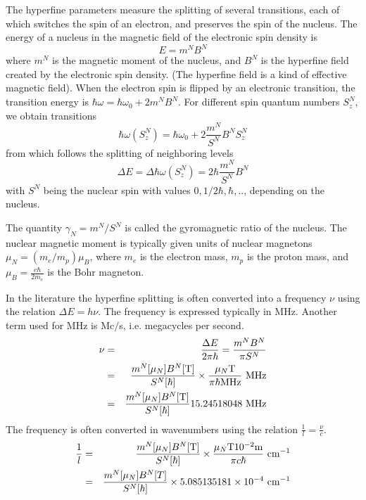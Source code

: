\documentclass[final,12pt]{article}
\begin{document}
The hyperfine parameters measure the splitting of several transitions,
each of which switches the spin of an electron, and preserves the spin
of the nucleus. The energy of a nucleus in the magnetic field of the
electronic spin density is
\begin{displaymath}
E=m^N B^N
\end{displaymath}
where $m^N$ is the magnetic moment of the nucleus, and $B^N$ is the
hyperfine field created by the electronic spin density. (The hyperfine
field is a kind of effective magnetic field). When the electron spin
is flipped by an electronic transition, the transition energy is
$\hbar\omega=\hbar\omega_0+2m^NB^N$. For different spin quantum
numbers $S^N_z$, we obtain transitions
\begin{equation}
\hbar\omega(S^N_z)=\hbar\omega_0+2\frac{m^N}{S^N}B^N S^N_z
\end{equation}
from which follows the splitting of neighboring levels
\begin{equation}
\Delta E=\Delta \hbar\omega(S^N_z)=2\hbar\frac{m^N}{S^N}B^N 
\end{equation}
with $S^N$ being the nuclear spin with values $0,1/2\hbar,\hbar,..$,
depending on the nucleus.

The quantity $\gamma_N=m^N/S^N$ is called the gyromagnetic ratio of
the nucleus.  The nuclear magnetic moment is typically given units of
nuclear magnetons $\mu_N=(m_e/m_p)\mu_B$, where $m_e$ is the electron
mass, $m_p$ is the proton mass, and $\mu_B=\frac{e\hbar}{2m_e}$ is the
Bohr magneton.

In the literature the hyperfine splitting is often converted into a
frequency $\nu$ using the relation $\Delta E=h\nu$. The frequency is
expressed typically in MHz. Another term used for MHz is Mc$/$s, i.e.
megacycles per second.
\begin{eqnarray*}
\nu&=&\frac{\Delta E}{2\pi\hbar} 
=\frac{m^N B^N}{\pi S^N}
\\
&=&
\frac{m^N[\mu_N]B^N[{\rm T}]}{S^N[\hbar]}
\times\frac{\mu_N {\rm T}}{\pi \hbar {\rm MHz}}\ {\rm MHz}
\\
&=&\frac{m^N[\mu_N]B^N[{\rm T}]}{S^N[\hbar]} 15.24518048\ {\rm MHz}
\end{eqnarray*}
The frequency is often converted in wavenumbers using the relation
$\frac{1}{l}=\frac{\nu}{c}$.
\begin{eqnarray*}
\frac{1}{l}&=&
\frac{m^N[\mu_N]B^N[{\rm T}]}{S^N[\hbar]} \times\frac{\mu_N {\rm T}
  10^{-2}{\rm m}}{\pi c\hbar
  }\ {\rm cm}^{-1}
\\
&=&
\frac{m^N[\mu_N]B^N[T]}{S^N[\hbar]} \times 5.085135181\times 10^{-4}\ {\rm cm}^{-1}
\end{eqnarray*}
\end{document}
